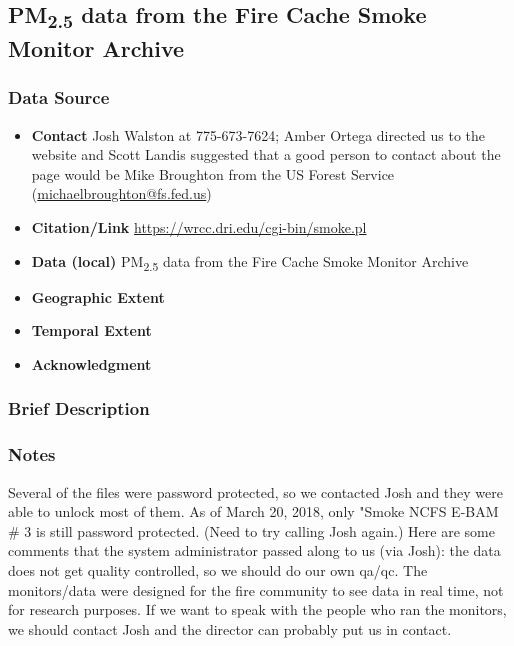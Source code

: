 \subsection{\texorpdfstring{PM\textsubscript{2.5}}{} data from the Fire Cache Smoke Monitor Archive}

\subsubsection*{Data Source}

\begin{itemize}[nolistsep]
\item \textbf{Contact} Josh Walston at 775-673-7624; Amber Ortega directed us to the website and Scott Landis suggested that a good person to contact about the page would be Mike Broughton from the US Forest Service (\url{michaelbroughton@fs.fed.us})
\item \textbf{Citation/Link} \url{https://wrcc.dri.edu/cgi-bin/smoke.pl}
\item \textbf{Data (local)} PM\textsubscript{2.5} data from the Fire Cache Smoke Monitor Archive
\item \textbf{Geographic Extent}
\item \textbf{Temporal Extent}
\item \textbf{Acknowledgment}
\end{itemize}

\subsubsection*{Brief Description}

\subsubsection*{Notes}

Several of the files were password protected, so we contacted Josh and they were able to unlock most of them. As of March 20, 2018, only "Smoke NCFS E-BAM \# 3 is still password protected. (Need to try calling Josh again.) Here are some comments that the system administrator passed along to us (via Josh): the data does not get quality controlled, so we should do our own qa/qc. The monitors/data were designed for the fire community to see data in real time, not for research purposes. If we want to speak with the people who ran the monitors, we should contact Josh and the director can probably put us in contact.

